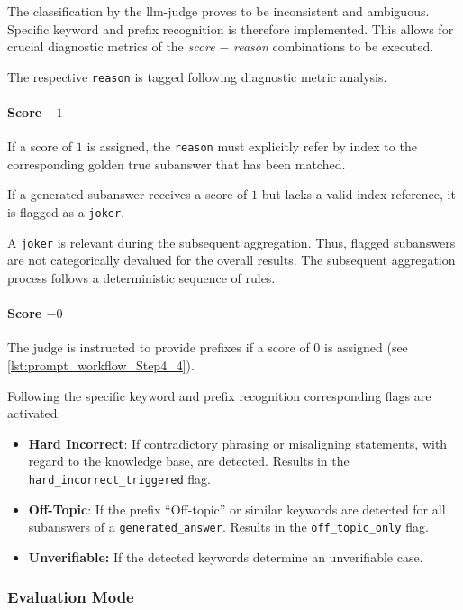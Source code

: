 The classification by the \ac{llm}-judge proves to be inconsistent and ambiguous.
Specific keyword and prefix recognition is therefore implemented.
This allows for crucial diagnostic metrics of the \textit{score} $-$ \textit{reason} combinations to be executed.

The respective \texttt{reason} is tagged following diagnostic metric analysis.
%
\paragraph{Score $- 1$}

If a score of $1$ is assigned, the \texttt{reason} must explicitly refer by index to the corresponding golden true subanswer that has been matched.

If a generated subanswer receives a score of $1$ but lacks a valid index reference, it is flagged as a \texttt{joker}. 

A \texttt{joker} is relevant during the subsequent aggregation.
Thus, flagged subanswers are not categorically devalued for the overall results.
The subsequent aggregation process follows a deterministic sequence of rules.
%
\paragraph{Score $- 0$}

The judge is instructed to provide prefixes if a score of $0$ is assigned (see \cref{lst:prompt_workflow_Step4_4}).

Following the specific keyword and prefix recognition corresponding flags are activated:
\begin{itemize}
    \item \textbf{Hard Incorrect}: If contradictory phrasing or misaligning statements, with regard to the knowledge base, are detected.
    Results in the \texttt{hard\_incorrect\_triggered} flag.
    \item \textbf{Off-Topic}: If the prefix \enquote{Off-topic} or similar keywords are detected for all subanswers of a \texttt{generated\_answer}.
    Results in the \texttt{off\_topic\_only} flag.
    \item \textbf{Unverifiable:} If the detected keywords determine an unverifiable case.
\end{itemize}

\subsubsection{Evaluation Mode}

